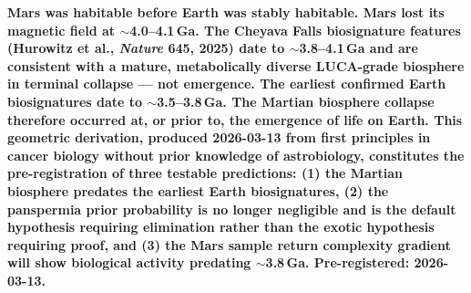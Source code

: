 \documentclass[11pt, a4paper]{article}
\begin{document}
\begin{mdframed}[
  backgroundcolor=boxblue,
  linecolor=boxblue,
  linewidth=0pt,
  innertopmargin=0.5em,
  innerbottommargin=0.5em,
  innerleftmargin=1em,
  innerrightmargin=1em
]
\begin{center}
\small\bfseries\color{white}
Mars was habitable before Earth was stably
habitable. Mars lost its magnetic field at
$\sim$4.0--4.1\,Ga. The Cheyava Falls biosignature
features (Hurowitz et al., \textit{Nature} 645,
2025) date to $\sim$3.8--4.1\,Ga and are consistent
with a mature, metabolically diverse LUCA-grade
biosphere in terminal collapse --- not emergence.
The earliest confirmed Earth biosignatures date to
$\sim$3.5--3.8\,Ga. The Martian biosphere collapse
therefore occurred at, or prior to, the emergence
of life on Earth. This geometric derivation,
produced 2026-03-13 from first principles in
cancer biology without prior knowledge of
astrobiology, constitutes the pre-registration
of three testable predictions: (1) the Martian
biosphere predates the earliest Earth
biosignatures, (2) the panspermia prior
probability is no longer negligible and is the
default hypothesis requiring elimination rather
than the exotic hypothesis requiring proof, and
(3) the Mars sample return complexity gradient
will show biological activity predating
$\sim$3.8\,Ga. Pre-registered: 2026-03-13.
\end{center}
\end{mdframed}

\vspace{1em}
\end{document}
